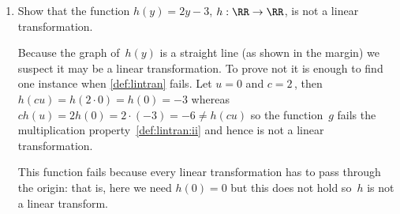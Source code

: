 \begin{example}[1D cases]
\begin{enumerate}
\item Show that the function \(h(y)=2y-3\), \(h:\RR\to\RR\), is not a linear transformation.
\begin{solution} 
Because the graph of~\(h(y)\) is a straight line (as shown in the margin) we suspect it may be a linear transformation.
To prove not it is enough to find one instance when \cref{def:lintran} fails. 
Let \(u=0\) and \(c=2\)\,, then \(h(cu)=h(2\cdot0)=h(0)=-3\) whereas \(ch(u)=2h(0)=2\cdot(-3)=-6\neq h(cu)\) so the function~\(g\) fails the multiplication property~\ref{def:lintran:ii} and hence is not a linear transformation.

This function fails because every linear transformation has to pass through the origin: that is, here we need \(h(0)=0\) but this does not hold so~\(h\) is not a linear transform.
\end{solution}


\end{enumerate}
\end{example}




